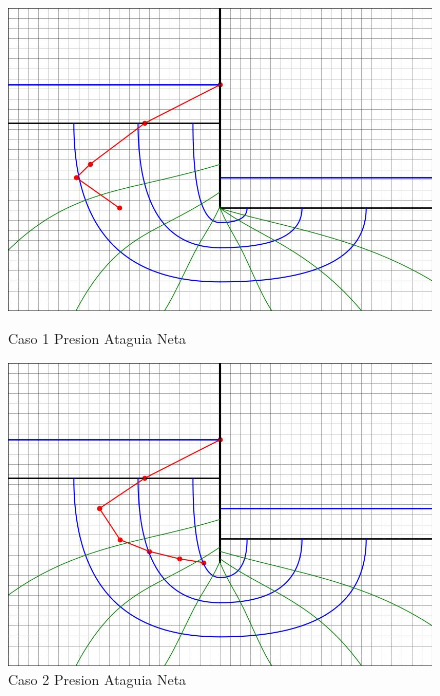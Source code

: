 \begin{figure}[H]
    \centering
    \begin{minipage}{0.32\textwidth}
        \centering
        \includegraphics[width=\textwidth]{GRAFICOS/caso_1_presion_ataguia_neta.jpg}
        \caption{Caso 1 Presion Ataguia Neta}
        \label{fig:caso_1_presion_ataguia_neta}
    \end{minipage}
    \begin{minipage}{0.32\textwidth}
        \centering
        \includegraphics[width=\textwidth]{GRAFICOS/caso_2_presion_ataguia_neta.jpg}
        \caption{Caso 2 Presion Ataguia Neta}
        \label{fig:caso_2_presion_ataguia_neta}
    \end{minipage}
    \begin{minipage}{0.32\textwidth}

\end{minipage}
\end{figure}
